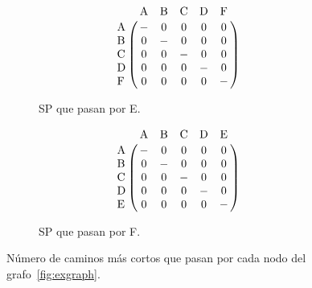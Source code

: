 \begin{figure}[htpb]
\begin{subfigure}[b]{.3\textwidth}
  \end{subfigure}
  \hspace{3mm}
  \begin{subfigure}[b]{.3\textwidth}
    \begin{equation*}
      \bordermatrix{
       ~  & $A$ & $B$ & $C$ & $D$ & $F$ \cr
      $A$ &  -  &  0  &  0  &  0  &  0  \cr
      $B$ &  0  &  -  &  0  &  0  &  0  \cr
      $C$ &  0  &  0  &  -  &  0  &  0  \cr
      $D$ &  0  &  0  &  0  &  -  &  0  \cr
      $F$ &  0  &  0  &  0  &  0  &  -  \cr
    }
    \end{equation*}
    \caption{SP que pasan por E.}
    \label{fig:sppn:e}
  \end{subfigure}
  \hspace{3mm}
  \begin{subfigure}[b]{.3\textwidth}
    \begin{equation*}
      \bordermatrix{
       ~  & $A$ & $B$ & $C$ & $D$ & $E$ \cr
      $A$ &  -  &  0  &  0  &  0  &  0  \cr
      $B$ &  0  &  -  &  0  &  0  &  0  \cr
      $C$ &  0  &  0  &  -  &  0  &  0  \cr
      $D$ &  0  &  0  &  0  &  -  &  0  \cr
      $E$ &  0  &  0  &  0  &  0  &  -  \cr
    }
    \end{equation*}
    \caption{SP que pasan por F.}
    \label{fig:sppn:f}
  \end{subfigure}
  \caption{Número de caminos más cortos que pasan por cada nodo del
  grafo~\ref{fig:exgraph}.}
  \label{fig:sppn}
\end{figure}
